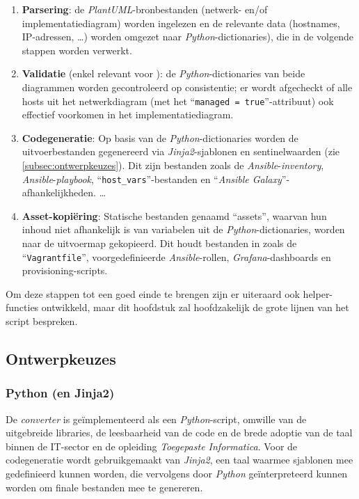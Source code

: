 \begin{enumerate}
  \item \textbf{Parsering}: de \emph{PlantUML}-bronbestanden (netwerk- en/of implementatiediagram) worden ingelezen en de relevante data (hostnames, IP-adressen, \ldots) worden omgezet naar \emph{Python}-dictionaries), die in de volgende stappen worden verwerkt.
  \item \textbf{Validatie} (enkel relevant voor ): de \emph{Python}-dictionaries van beide diagrammen worden gecontroleerd op consistentie; er wordt afgecheckt of alle hosts uit het netwerkdiagram (met het ``\texttt{managed = true}''-attribuut) ook effectief voorkomen in het implementatiediagram.
  \item \textbf{Codegeneratie}: Op basis van de \emph{Python}-dictionaries worden de uitvoerbestanden gegenereerd via \emph{Jinja2}-sjablonen en sentinelwaarden (zie \autoref{subsec:ontwerpkeuzes}). Dit zijn bestanden zoals de \emph{Ansible}-\emph{inventory}, \emph{Ansible}-\emph{playbook}, ``\texttt{host\_vars}''-bestanden en ``\emph{Ansible Galaxy}''-afhankelijkheden. \ldots
  \item \textbf{Asset-kopiëring}: Statische bestanden genaamd ``assets'', waarvan hun inhoud niet afhankelijk is van variabelen uit de \emph{Python}-dictionaries,  worden naar de uitvoermap gekopieerd. Dit houdt bestanden in zoals de ``\texttt{Vagrantfile}'', voorgedefinieerde \emph{Ansible}-rollen, \emph{Grafana}-dashboards en provisioning-scripts.
\end{enumerate}

Om deze stappen tot een goed einde te brengen zijn er uiteraard ook helper-functies ontwikkeld, maar dit hoofdstuk zal hoofdzakelijk de grote lijnen van het script bespreken.

\subsection{Ontwerpkeuzes}%
\label{subsec:ontwerpkeuzes}

\subsubsection{Python (en Jinja2)}

De \emph{converter} is geïmplementeerd als een \emph{Python}-script, omwille van de uitgebreide libraries, de leesbaarheid van de code en de brede adoptie van de taal binnen de IT-sector en de opleiding \emph{Toegepaste Informatica}.
Voor de codegeneratie wordt gebruikgemaakt van \emph{Jinja2}, een taal waarmee sjablonen mee gedefinieerd kunnen worden, die vervolgens door \emph{Python} geïnterpreteerd kunnen worden om finale bestanden mee te genereren.

